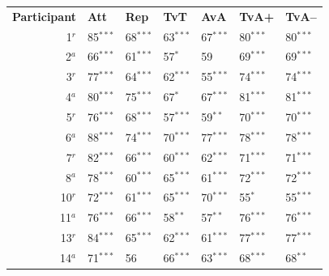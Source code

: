 \begin{table}[p]
    \renewcommand{\arraystretch}{0.85}
    \centering
    \begin{tabular}{rllllll}
        \textbf{Participant}& \textbf{Att}       & \textbf{Rep}       & \textbf{TvT}      & \textbf{AvA}      & \textbf{TvA+}     & \textbf{TvA--}    \\
        1$^r$               & 85{\tiny$^{***}$}  & 68{\tiny$^{***}$}  & 63{\tiny$^{***}$} & 67{\tiny$^{***}$} & 80{\tiny$^{***}$} & 80{\tiny$^{***}$} \\
        2$^a$               & 66{\tiny$^{***}$}  & 61{\tiny$^{***}$}  & 57{\tiny$^{*}$}   & 59                & 69{\tiny$^{***}$} & 69{\tiny$^{***}$} \\
        3$^r$               & 77{\tiny$^{***}$}  & 64{\tiny$^{***}$}  & 62{\tiny$^{***}$} & 55{\tiny$^{***}$} & 74{\tiny$^{***}$} & 74{\tiny$^{***}$} \\
        4$^a$               & 80{\tiny$^{***}$}  & 75{\tiny$^{***}$}  & 67{\tiny$^{*}$}   & 67{\tiny$^{***}$} & 81{\tiny$^{***}$} & 81{\tiny$^{***}$} \\
        5$^r$               & 76{\tiny$^{***}$}  & 68{\tiny$^{***}$}  & 57{\tiny$^{***}$} & 59{\tiny$^{**}$}  & 70{\tiny$^{***}$} & 70{\tiny$^{***}$} \\
        6$^a$               & 88{\tiny$^{***}$}  & 74{\tiny$^{***}$}  & 70{\tiny$^{***}$} & 77{\tiny$^{***}$} & 78{\tiny$^{***}$} & 78{\tiny$^{***}$} \\
        7$^r$               & 82{\tiny$^{***}$}  & 66{\tiny$^{***}$}  & 60{\tiny$^{***}$} & 62{\tiny$^{***}$} & 71{\tiny$^{***}$} & 71{\tiny$^{***}$} \\
        8$^a$               & 78{\tiny$^{***}$}  & 60{\tiny$^{***}$}  & 65{\tiny$^{***}$} & 61{\tiny$^{***}$} & 72{\tiny$^{***}$} & 72{\tiny$^{***}$} \\
        10$^r$              & 72{\tiny$^{***}$}  & 61{\tiny$^{***}$}  & 65{\tiny$^{***}$} & 70{\tiny$^{***}$} & 55{\tiny$^{*}$}   & 55{\tiny$^{***}$} \\
        11$^a$              & 76{\tiny$^{***}$}  & 66{\tiny$^{***}$}  & 58{\tiny$^{**}$}  & 57{\tiny$^{**}$}  & 76{\tiny$^{***}$} & 76{\tiny$^{***}$} \\
        13$^r$              & 84{\tiny$^{***}$}  & 65{\tiny$^{***}$}  & 62{\tiny$^{***}$} & 61{\tiny$^{***}$} & 77{\tiny$^{***}$} & 77{\tiny$^{***}$} \\
        14$^a$              & 71{\tiny$^{***}$}  & 56                 & 66{\tiny$^{***}$} & 63{\tiny$^{***}$} & 68{\tiny$^{***}$} & 68{\tiny$^{**}$}  \\

\end{tabular}
\end{table}
